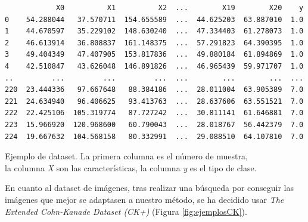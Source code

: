 \begin{code}[h]
\begin{lstlisting}
            X0          X1          X2  ...        X19        X20    y
0    54.288044   37.570711  154.655589  ...  44.625203  63.887010  1.0
1    44.670597   35.229102  148.630240  ...  47.334403  61.278073  1.0
2    46.613914   36.808837  161.148375  ...  57.291823  64.390395  1.0
3    49.404349   47.407905  153.817836  ...  49.880184  61.894869  1.0
4    42.510847   43.626048  146.891826  ...  46.965439  59.971707  1.0
..         ...         ...         ...  ...        ...        ...  ...
220  23.444336   97.667648   88.384186  ...  28.011004  63.905389  7.0
221  24.634940   96.406625   93.413763  ...  28.637606  63.551521  7.0
222  22.425106  105.319774   87.727242  ...  30.811141  61.646881  7.0
223  15.966920  120.968600   60.790043  ...  28.018767  56.442379  7.0
224  19.667632  104.568158   80.332991  ...  29.088510  64.107810  7.0
\end{lstlisting}
\captionsetup{justification=centering}
\caption[Ejemplo de dataset. La primera columna es el número de muestra, \\
la columna \textit{X} son las características, la columna \textit{y} es el tipo de clase.]{Ejemplo de dataset. La primera columna es el número de muestra, \\
la columna \textit{X} son las características, la columna \textit{y} es el tipo de clase.}
\label{cod:ejemplo_dataset}
\end{code}

En cuanto al dataset de imágenes, tras realizar una búsqueda por conseguir las imágenes que mejor se adaptasen a nuestro método, se ha decidido usar \textit{The Extended Cohn-Kanade Dataset (CK+)}\cite{Kanade1}\cite{Kanade2} (Figura \ref{fig:ejemplosCK}). \\

